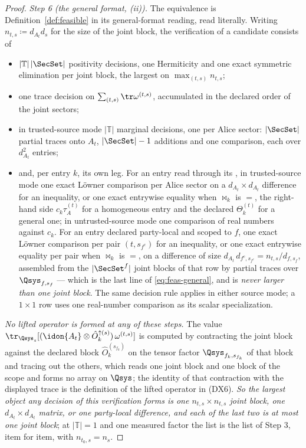 \begin{proof}
\emph{Step 6 (the general format, (ii)).} The equivalence is
Definition~\ref{def:feasible} in its general-format reading, read literally.
Writing $n_{t,s}\coloneqq d_{A_t}d_s$ for the size of the joint block, the
verification of a candidate consists of
\begin{itemize}[leftmargin=1.6em]
\item $|\mathbb{T}|\,|\SecSet|$ positivity decisions, one Hermiticity and one
  exact symmetric elimination per joint block, the largest on
  $\max_{(t,s)}n_{t,s}$;
\item one trace decision on $\sum_{(t,s)}\tr\omega^{(t,s)}$, accumulated in
  the declared order of the joint sectors;
\item in trusted-source mode $|\mathbb{T}|$ marginal decisions, one per Alice
  sector: $|\SecSet|$ partial traces onto $A_t$, $|\SecSet|-1$ additions and
  one comparison, each over $d_{A_t}^2$ entries;
\item and, per entry $k$, its own leg. For an entry read through its
  , in trusted-source mode one exact L\"owner
  comparison per Alice sector on a $d_{A_t}\times d_{A_t}$ difference for an
  inequality, or one exact entrywise equality when $\bowtie_k$ is $=$, the
  right-hand side $c_k\tau^{(t)}_A$ for a homogeneous entry and the declared
  $\Theta^{(t)}_k$ for a general one; in untrusted-source mode one comparison
  of real numbers against $c_k$. For an entry declared party-local and scoped
  to $f$, one exact L\"owner comparison per pair $(t,s_{f^c})$ for an
  inequality, or one exact entrywise equality per pair when $\bowtie_k$ is
  $=$, on a difference of size
  $d_{A_t}\,d_{f^c,s_{f^c}}=n_{t,s}/d_{f,s_f}$, assembled from the
  $|\SecSet^{f}|$ joint blocks of that row by partial traces over
  $\Qsys_{f,s_f}$ --- which is the last line of \eqref{eq:feas-general}, and
  is \emph{never larger than one joint block}. The same decision rule applies
  in either source mode; a $1\times1$ row uses one real-number comparison as
  its scalar specialization.
\end{itemize}
\emph{No lifted operator is formed at any of these steps.} The value
$\tr_{\Qsys_s}[(\idon{A_t}\otimes\hat O^{\uparrow(s)}_k)\,\omega^{(t,s)}]$ is
computed by contracting the joint block against the declared block
$\hat O^{(s_{f_k})}_k$ on the tensor factor $\Qsys_{f_k,s_{f_k}}$ of that
block and tracing out the others, which reads one joint block and one block of
the scope and forms no array on $\Qsys$; the identity of that contraction with
the displayed trace is the definition of the lifted operator in (DX6).
\emph{So the largest object any decision of this verification forms is one
$n_{t,s}\times n_{t,s}$ joint block, one $d_{A_t}\times d_{A_t}$ matrix, or one
party-local difference, and each of the last two is at most one joint block};
at $|\mathbb{T}|=1$ and one measured factor the list is the list of Step 3,
item for item, with $n_{t_0,s}=n_s$.
\end{proof}
